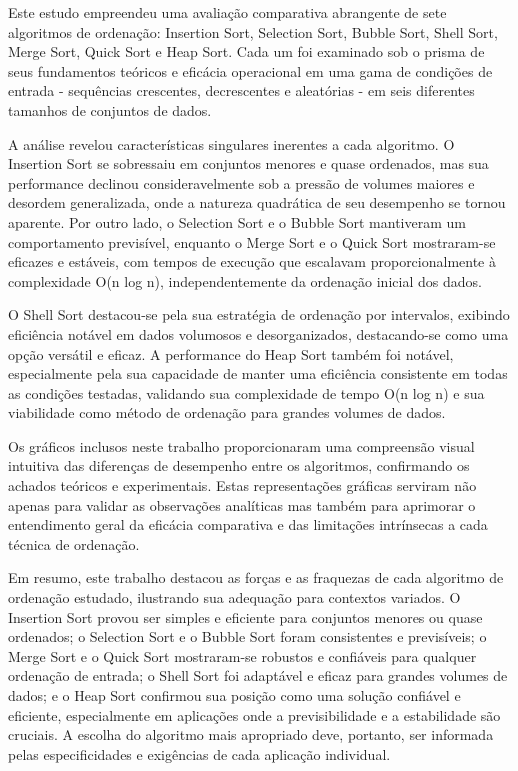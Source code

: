 Este estudo empreendeu uma avaliação comparativa abrangente de sete algoritmos de ordenação: Insertion Sort, Selection Sort, Bubble Sort, Shell Sort, Merge Sort, Quick Sort e Heap Sort. Cada um foi examinado sob o prisma de seus fundamentos teóricos e eficácia operacional em uma gama de condições de entrada - sequências crescentes, decrescentes e aleatórias - em seis diferentes tamanhos de conjuntos de dados.

A análise revelou características singulares inerentes a cada algoritmo. O Insertion Sort se sobressaiu em conjuntos menores e quase ordenados, mas sua performance declinou consideravelmente sob a pressão de volumes maiores e desordem generalizada, onde a natureza quadrática de seu desempenho se tornou aparente. Por outro lado, o Selection Sort e o Bubble Sort mantiveram um comportamento previsível, enquanto o Merge Sort e o Quick Sort mostraram-se eficazes e estáveis, com tempos de execução que escalavam proporcionalmente à complexidade O(n log n), independentemente da ordenação inicial dos dados.

O Shell Sort destacou-se pela sua estratégia de ordenação por intervalos, exibindo eficiência notável em dados volumosos e desorganizados, destacando-se como uma opção versátil e eficaz. A performance do Heap Sort também foi notável, especialmente pela sua capacidade de manter uma eficiência consistente em todas as condições testadas, validando sua complexidade de tempo O(n log n) e sua viabilidade como método de ordenação para grandes volumes de dados.

Os gráficos inclusos neste trabalho proporcionaram uma compreensão visual intuitiva das diferenças de desempenho entre os algoritmos, confirmando os achados teóricos e experimentais. Estas representações gráficas serviram não apenas para validar as observações analíticas mas também para aprimorar o entendimento geral da eficácia comparativa e das limitações intrínsecas a cada técnica de ordenação.

Em resumo, este trabalho destacou as forças e as fraquezas de cada algoritmo de ordenação estudado, ilustrando sua adequação para contextos variados. O Insertion Sort provou ser simples e eficiente para conjuntos menores ou quase ordenados; o Selection Sort e o Bubble Sort foram consistentes e previsíveis; o Merge Sort e o Quick Sort mostraram-se robustos e confiáveis para qualquer ordenação de entrada; o Shell Sort foi adaptável e eficaz para grandes volumes de dados; e o Heap Sort confirmou sua posição como uma solução confiável e eficiente, especialmente em aplicações onde a previsibilidade e a estabilidade são cruciais. A escolha do algoritmo mais apropriado deve, portanto, ser informada pelas especificidades e exigências de cada aplicação individual.